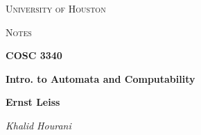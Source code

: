 \documentclass[a4paper]{article}
\theoremstyle{definition}
\begin{document}
\begin{titlepage}
	\centering
	{\scshape\LARGE University of Houston\par}
	\vspace{1cm}
	{\scshape\Large Notes \par}
	\vspace{1.5cm}
	{\huge\bfseries COSC 3340 \par}
	{\huge\bfseries Intro. to Automata and Computability \par}
	\vspace{0.5cm}
	{\large\bfseries Ernst Leiss\par}
	\vspace{1cm}
	{\Large\itshape Khalid Hourani}
	\vspace{0.5cm}
	{\large \par} %
	\vfill
\end{titlepage}

\tableofcontents
\newpage{}




\end{document}
